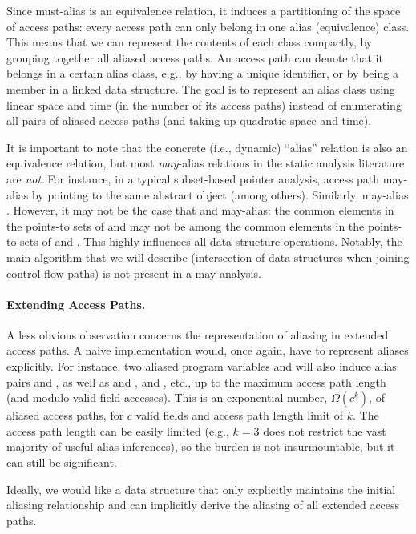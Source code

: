 Since must-alias is an equivalence relation, it
induces a partitioning of the space of access paths: every access path can only
belong in one alias (equivalence) class. This means that we can represent the
contents of each class compactly, by grouping together all aliased access
paths. An access path can denote that it belongs in a certain alias class,
e.g., by having a unique identifier, or by being a member in a linked data
structure. The goal is to represent an alias class using linear space and time
(in the number of its access paths) instead of enumerating all pairs of aliased
access paths (and taking up quadratic space and time).

It is important to note that the concrete (i.e., dynamic) ``alias'' relation is
also an equivalence relation, but most \emph{may}-alias relations in the static
analysis literature are \emph{not}. For instance, in a typical subset-based
pointer analysis, access path  may-alias  by pointing to
the same abstract object (among others). Similarly,  may-alias
. However, it may not be the case that  and 
may-alias: the common elements in the points-to sets of  and
 may not be among the common elements in the points-to sets of
 and . This highly influences all data structure
operations.  Notably, the main algorithm that we will describe (intersection of
data structures when joining control-flow paths) is not present in a may
analysis.

\paragraph{Extending Access Paths.} A less obvious observation concerns the
representation of aliasing in extended access paths. A naive implementation
would, once again, have to represent aliases explicitly.  For instance, two
aliased program variables  and  will also induce alias pairs
 and , as well as  and ,  and
, etc., up to the maximum access path length (and modulo valid field
accesses). This is an exponential number, $\Omega(c^k)$, of aliased access
paths, for $c$ valid fields and access path length limit of $k$. The access
path length can be easily limited (e.g., $k = 3$ does not restrict the vast
majority of useful alias inferences), so the burden is not insurmountable, but
it can still be significant.

Ideally, we would like a data structure that only explicitly maintains the
initial aliasing relationship and can implicitly derive the aliasing of all
extended access paths.

